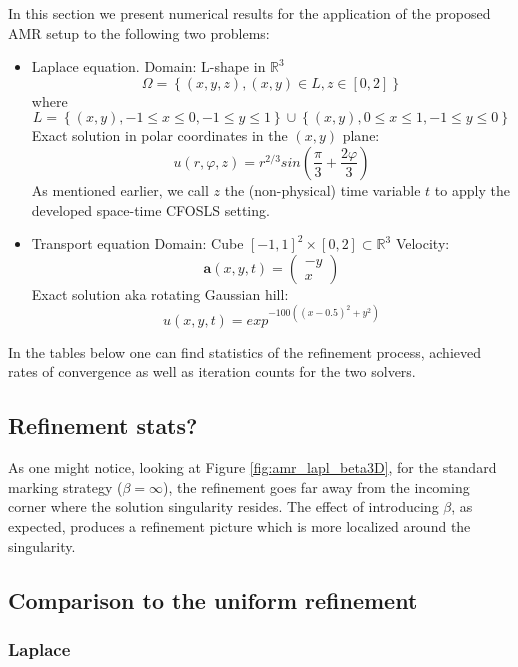 \documentclass[a4paper,12pt]{amsart}
\numberwithin{equation}{section}
\def\bu{{\mathbf a}} %
\begin{document}
In this section we present numerical results for the application of the proposed AMR setup to the following two problems:

\begin{itemize}
	\item Laplace equation. \newline
	Domain: L-shape in $\mathbb{R}^3$
	$$
	\Omega = \left\{ (x,y,z), (x,y) \in L, z\in [0,2] \right\}
	$$
	where
	$$
	L = \left\{ (x,y), -1 \leq x \leq 0, -1 \leq y \leq 1 \right\} \cup
	\left\{ (x,y), 0 \leq x \leq 1, -1 \leq y \leq 0 \right\}
	$$
	Exact solution in polar coordinates in the $(x,y)$ plane:
	$$
	u(r,\varphi,z) = r^{2/3} sin ( \frac{\pi}{3} + \frac{2\varphi}{3} )
	$$
	As mentioned earlier, we call $z$ the (non-physical) time variable $t$ to apply the developed space-time CFOSLS setting.
	\item Transport equation \newline
	Domain: Cube $[-1,1]^2 \times [0,2] \subset \mathbb{R}^3$ \newline
	Velocity: 
	$$
	\bu(x,y,t) = 
	\left(
	\begin{array}{c}
	-y \\
    x
	\end{array}
	\right)
	$$
	Exact solution aka rotating Gaussian hill:
	$$
	u(x,y,t) = exp^{-100 \left( (x-0.5)^2 + y^2 \right) }
	$$
\end{itemize}

In the tables below one can find statistics of the refinement process, achieved rates of convergence as well as iteration counts for the two solvers.

\subsection{Refinement stats?}

As one might notice, looking at Figure \ref{fig:amr_lapl_beta3D}, for the standard marking strategy ($\beta = \infty$), the refinement goes far away from the incoming corner where the solution singularity resides. The effect of introducing $\beta$, as expected, produces a refinement picture which is more localized around the singularity.

\subsection{Comparison to the uniform refinement}

\subsubsection{Laplace}
\end{document}
